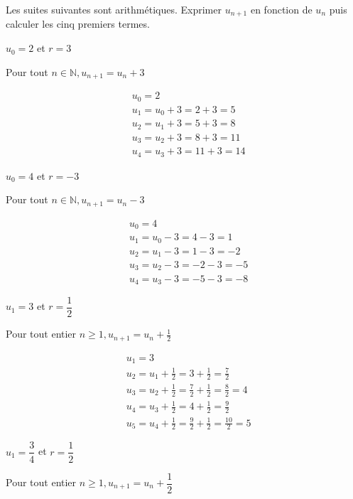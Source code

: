 \documentclass[11pt,a4paper]{article}  %
\begin{document}
Les suites suivantes sont arithmétiques. Exprimer $u_{n+1}$ en fonction de $u_n$ puis calculer les cinq premiers termes.
	\begin{enumMet}
	\item $u_0=2$ et $r=3$
	\begin{corrBox}
		Pour tout $n \in \mathbb{N}, u_{n+1}=u_n+3$
		
		$$
		\begin{aligned}
			& u_0=2 \\
			& u_1=u_0+3=2+3=5 \\
			& u_2=u_1+3=5+3=8 \\
			& u_3=u_2+3=8+3=11 \\
			& u_4=u_3+3=11+3=14
		\end{aligned}
		$$
				
	\end{corrBox}
	\item $u_0=4$ et $r=-3$
	\begin{corrBox}
		
		Pour tout $n \in \mathbb{N}, u_{n+1}=u_n-3$
		
		$$
		\begin{aligned}
			& u_0=4 \\
			& u_1=u_0-3=4-3=1 \\
			& u_2=u_1-3=1-3=-2 \\
			& u_3=u_2-3=-2-3=-5 \\
			& u_4=u_3-3=-5-3=-8
		\end{aligned}
		$$
				
	\end{corrBox}
	\item $u_1=3$ et $r=\dfrac{1}{2}$
	\begin{corrBox}
		Pour tout entier $n \geqslant 1, u_{n+1}=u_n+\frac{1}{2}$
		
		$$
		\begin{aligned}
			& u_1=3 \\
			& u_2=u_1+\frac{1}{2}=3+\frac{1}{2}=\frac{7}{2} \\
			& u_3=u_2+\frac{1}{2}=\frac{7}{2}+\frac{1}{2}=\frac{8}{2}=4 \\
			& u_4=u_3+\frac{1}{2}=4+\frac{1}{2}=\frac{9}{2} \\
			& u_5=u_4+\frac{1}{2}=\frac{9}{2}+\frac{1}{2}=\frac{10}{2}=5
		\end{aligned}
		$$		
	\end{corrBox}
	\item $u_1=\dfrac{3}{4}$ et $r=\dfrac{1}{2}$
	\begin{corrBox}
		Pour tout entier $n \geqslant 1, u_{n+1}=u_n+\dfrac{1}{2}$
		

\end{corrBox}
\end{enumMet}
\end{document}
